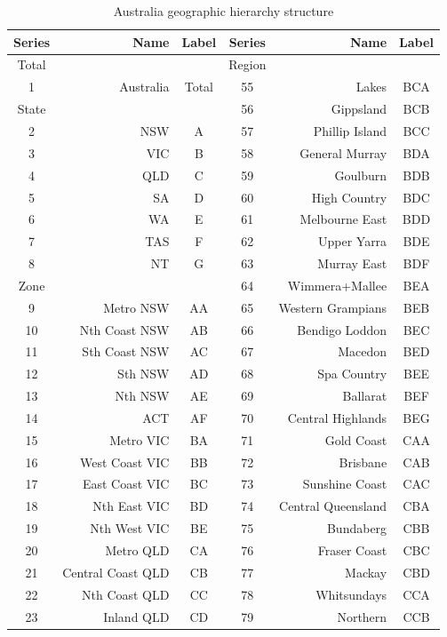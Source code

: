 \documentclass[11pt,a4paper,]{article}
\begin{document}
\begin{table}[t]

\caption{\label{tab:Australiageographicaldivision}Australia geographic hierarchy structure}
\centering
\fontsize{9}{11}\selectfont
\begin{tabular}{crccrc}
\toprule
Series & Name & Label & Series & Name & Label\\
\midrule
Total &  &  & Region &  & \\
1 & Australia & Total & 55 & Lakes & BCA\\
State &  &  & 56 & Gippsland & BCB\\
2 & NSW & A & 57 & Phillip Island & BCC\\
3 & VIC & B & 58 & General Murray & BDA\\
4 & QLD & C & 59 & Goulburn & BDB\\
5 & SA & D & 60 & High Country & BDC\\
6 & WA & E & 61 & Melbourne East & BDD\\
7 & TAS & F & 62 & Upper Yarra & BDE\\
8 & NT & G & 63 & Murray East & BDF\\
Zone &  &  & 64 & Wimmera+Mallee & BEA\\
9 & Metro NSW & AA & 65 & Western Grampians & BEB\\
10 & Nth Coast NSW & AB & 66 & Bendigo Loddon & BEC\\
11 & Sth Coast NSW & AC & 67 & Macedon & BED\\
12 & Sth NSW & AD & 68 & Spa Country & BEE\\
13 & Nth NSW & AE & 69 & Ballarat & BEF\\
14 & ACT & AF & 70 & Central Highlands & BEG\\
15 & Metro VIC & BA & 71 & Gold Coast & CAA\\
16 & West Coast VIC & BB & 72 & Brisbane & CAB\\
17 & East Coast VIC & BC & 73 & Sunshine Coast & CAC\\
18 & Nth East VIC & BD & 74 & Central Queensland & CBA\\
19 & Nth West VIC & BE & 75 & Bundaberg & CBB\\
20 & Metro QLD & CA & 76 & Fraser Coast & CBC\\
21 & Central Coast QLD & CB & 77 & Mackay & CBD\\
22 & Nth Coast QLD & CC & 78 & Whitsundays & CCA\\
23 & Inland QLD & CD & 79 & Northern & CCB\\

\end{tabular}
\end{table}
\end{document}
